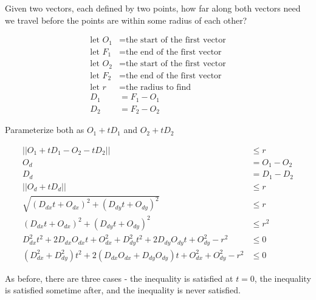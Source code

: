 \documentclass[letterpaper,12pt]{article}
\begin{document}
Given two vectors, each defined by two points, how far along both vectors need we travel before the points are within some radius of each other?

\begin{align}
\textrm{let } O_1 &= \textrm{the start of the first vector}\\
\textrm{let } F_1 &= \textrm{the end of the first vector}\\
\textrm{let } O_2 &= \textrm{the start of the first vector}\\
\textrm{let } F_2 &= \textrm{the end of the first vector}\\
\textrm{let } r &= \textrm{the radius to find}\\
D_1 &= F_1 - O_1\\
D_2 &= F_2 - O_2
\end{align}

Parameterize both as \(O_1 + tD_1\) and \(O_2 + tD_2\)

\begin{align}
||O_1 + tD_1 - O_2 - tD_2|| &\leq r\\
O_d &= O_1 - O_2\\
D_d &= D_1 - D_2\\
||O_d + tD_d|| &\leq r\\
\sqrt{(D_{dx}t + O_{dx})^2 + (D_{dy}t + O_{dy})^2} &\leq r\\
(D_{dx}t + O_{dx})^2 + (D_{dy}t + O_{dy})^2 &\leq r^2\\
D_{dx}^2t^2 + 2D_{dx}O_{dx}t + O_{dx}^2 + D_{dy}^2t^2 + 2D_{dy}O_{dy}t + O_{dy}^2 - r^2 &\leq 0\\
(D_{dx}^2 + D_{dy}^2)t^2 + 2(D_{dx}O_{dx} + D_{dy}O_{dy})t + O_{dx}^2 + O_{dy}^2 - r^2 &\leq 0
\end{align}

As before, there are three cases - the inequality is satisfied at \(t = 0\), the inequality is satisfied sometime after, and the inequality is never satisfied.
\end{document}
